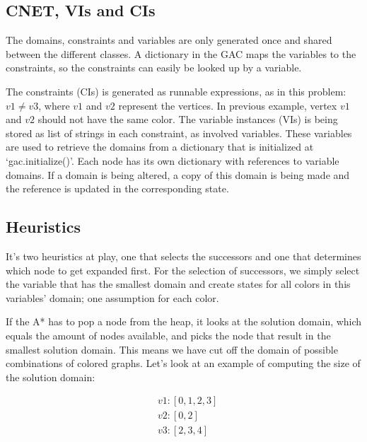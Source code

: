 

\subsection{CNET, VIs and CIs}
The domains, constraints and variables are only generated once and shared between the different classes. A dictionary in the GAC maps the variables to the constraints, so the constraints can easily be looked up by a variable.

The constraints (CIs) is generated as runnable expressions, as in this problem: \( v1 \neq v3 \), where \(v1\) and \(v2\) represent the vertices. In previous example, vertex \(v1\) and \(v2\) should not have the same color. The variable instances (VIs) is being stored as list of strings in each constraint, as involved variables. These variables are used to retrieve the domains from a dictionary that is initialized at `gac.initialize()'. Each node has its own dictionary with references to variable domains. If a domain is being altered, a copy of this domain is being made and the reference is updated in the corresponding state.

\subsection*{Heuristics}
It's two heuristics at play, one that selects the successors and one that determines which node to get expanded first. For the selection of successors, we simply select the variable that has the smallest domain and create states for all colors in this variables' domain; one assumption for each color.

If the A* has to pop a node from the heap, it looks at the solution domain, which equals the amount of nodes available, and picks the node that result in the smallest solution domain. This means we have cut off the domain of possible combinations of colored graphs. Let's look at an example of computing the size of the solution domain:

\begin{align*}
	&v1: [0,1,2,3]\\
	&v2: [0,2]\\
	&v3: [2,3,4]
\end{align*}

